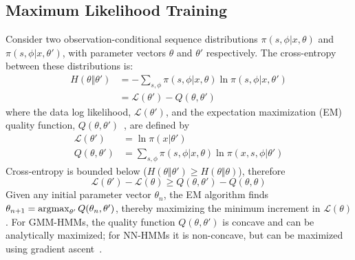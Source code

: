 \subsection{Maximum Likelihood Training}

Consider two observation-conditional sequence distributions
$\pi(s,\phi|x,\theta)$ and $\pi(s,\phi|x,\theta')$, with parameter
vectors $\theta$ and $\theta'$ respectively.  The cross-entropy
between these distributions is:
\begin{align}
  H\left(\theta\Vert\theta'\right) &=
  -\sum_{s,\phi} \pi(s,\phi|x,\theta)
  \ln \pi(s,\phi|x,\theta')\\
  &=  {\mathcal L}\left(\theta'\right)-Q\left(\theta,\theta'\right)
  \label{eq:crossentropy}
\end{align}
where the data log likelihood, ${\mathcal L}\left(\theta'\right)$, and
the expectation maximization (EM) quality function,
$Q\left(\theta,\theta'\right)$~\cite{Dempster77}, are defined by
\begin{align}
  {\mathcal L}\left(\theta'\right) &= \ln \pi(x|\theta')
  \label{eq:loglikelihood}\\
  Q\left(\theta,\theta'\right)
  &=
  \sum_{s,\phi} \pi(s,\phi|x,\theta)\ln \pi(x,s,\phi |\theta')
   \label{eq:Qfunction}
\end{align}
Cross-entropy is bounded below ($H\left(\theta\Vert\theta'\right)\ge
H\left(\theta\Vert\theta\right)$), therefore
\begin{equation}
  {\mathcal L}\left(\theta'\right)-{\mathcal L}\left(\theta\right)\ge
  Q\left(\theta,\theta'\right)-
  Q\left(\theta,\theta\right)
  \label{eq:LgeQ}
\end{equation}
Given any initial parameter vector $\theta_n$, the EM
algorithm finds $\theta_{n+1}=\operatorname*{argmax}_{\theta'}
Q(\theta_n,\theta')$, thereby maximizing the minimum increment in
${\mathcal L}(\theta)$.  For GMM-HMMs, the quality function
$Q\left(\theta,\theta'\right)$ is concave and can be analytically
maximized; for NN-HMMs it is non-concave, but can be maximized using
gradient ascent~\cite{Bengio92}.


